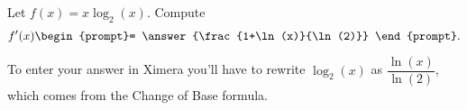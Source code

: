 \documentclass{ximera}
\author{Steven Gubkin \and Bobby Ramsey}
\begin{document}
\begin{exercise}

Let $f(x) = x\log_2(x)$. Compute
\[
f'(x) \begin{prompt}= \answer{\frac{1+\ln(x)}{\ln(2)}}
\end{prompt}.
\]
\begin{hint}
	To enter your answer in Ximera you'll have to rewrite $\log_2(x)$ as $\dfrac{\ln(x)}{\ln(2)}$, which comes from the Change of Base formula.
\end{hint}


\end{exercise}
\end{document}
